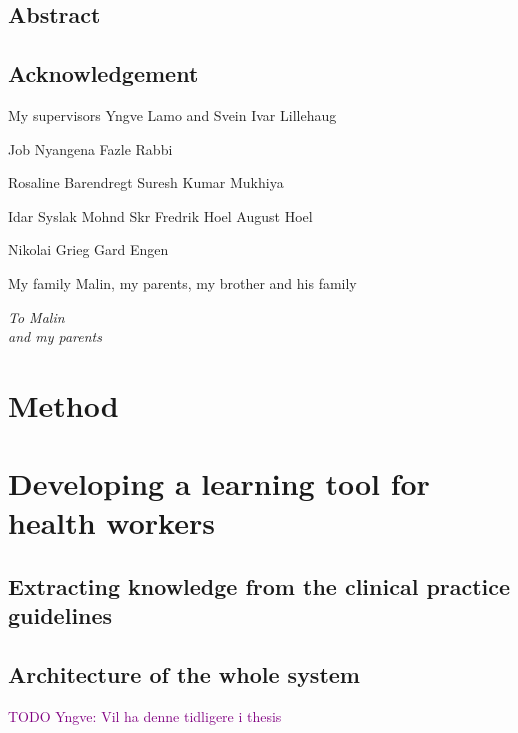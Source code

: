 \documentclass[a4paper,12pt]{book}
\begin{document}
\frontmatter


\newpage
\section*{Abstract}
\newpage
\section*{Acknowledgement}
My supervisors Yngve Lamo and Svein Ivar Lillehaug

Job Nyangena
Fazle Rabbi

Rosaline Barendregt
Suresh Kumar Mukhiya

Idar Syslak
Mohnd Skr
Fredrik Hoel
August Hoel

Nikolai Grieg
Gard Engen

My family Malin, my parents, my brother and his family
\newpage
\begin{flushright}
	\null{}
	\itshape
	To Malin \\
	and my parents
	\null
\end{flushright}

\tableofcontents
\mainmatter






\chapter{Method}




\chapter{Developing a learning tool for health workers}
\section{Extracting knowledge from the clinical  practice guidelines}








\section{Architecture of the whole system}
\textcolor{purple}{TODO Yngve: Vil ha denne tidligere i thesis}
\end{document}
